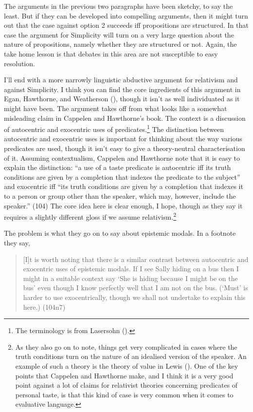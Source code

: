 \documentclass[
  10pt,
  letterpaper,
  DIV=11,
  numbers=noendperiod,
  twoside]{scrartcl}
\begin{document}
The arguments in the previous two paragraphs have been sketchy, to say
the least. But if they can be developed into compelling arguments, then
it might turn out that the case against option 2 succeeds iff
propositions are structured. In that case the argument for Simplicity
will turn on a very large question about the nature of propositions,
namely whether they are structured or not. Again, the take home lesson
is that debates in this area are not susceptible to easy resolution.

I'll end with a more narrowly linguistic abductive argument for
relativism and against Simplicity. I think you can find the core
ingredients of this argument in Egan, Hawthorne, and Weatherson
(), though it isn't as well
individuated as it might have been. The argument takes off from what
looks like a somewhat misleading claim in Cappelen and Hawthorne's book.
The context is a discussion of autocentric and exocentric uses of
predicates.\footnote{The terminology is from Lasersohn
  ().} The distinction between
autocentric and exocentric uses is important for thinking about the way
various predicates are used, though it isn't easy to give a
theory-neutral characterisation of it. Assuming contextualism, Cappelen
and Hawthorne note that it is easy to explain the distinction: ``a use
of a taste predicate is autocentric iff its truth conditions are given
by a completion that indexes the predicate to the subject'' and
exocentric iff ``its truth conditions are given by a completion that
indexes it to a person or group other than the speaker, which may,
however, include the speaker.'' (104) The core idea here is clear
enough, I hope, though as they say it requires a slightly different
gloss if we assume relativism.\footnote{As they also go on to note,
  things get very complicated in cases where the truth conditions turn
  on the nature of an idealised version of the speaker. An example of
  such a theory is the theory of value in Lewis
  (). One of the key points that Cappelen
  and Hawthorne make, and I think it is a very good point against a lot
  of claims for relativist theories concerning predicates of personal
  taste, is that this kind of case is very common when it comes to
  evaluative language.}

The problem is what they go on to say about epistemic modals. In a
footnote they say,

\begin{quote}
{[}I{]}t is worth noting that there is a similar contrast between
autocentric and exocentric uses of epistemic modals. If I see Sally
hiding on a bus then I might in a suitable context say `She is hiding
because I might be on the bus' even though I know perfectly well that I
am not on the bus. (`Must' is harder to use exocentrically, though we
shall not undertake to explain this here.) (104n7)
\end{quote}
\end{document}
